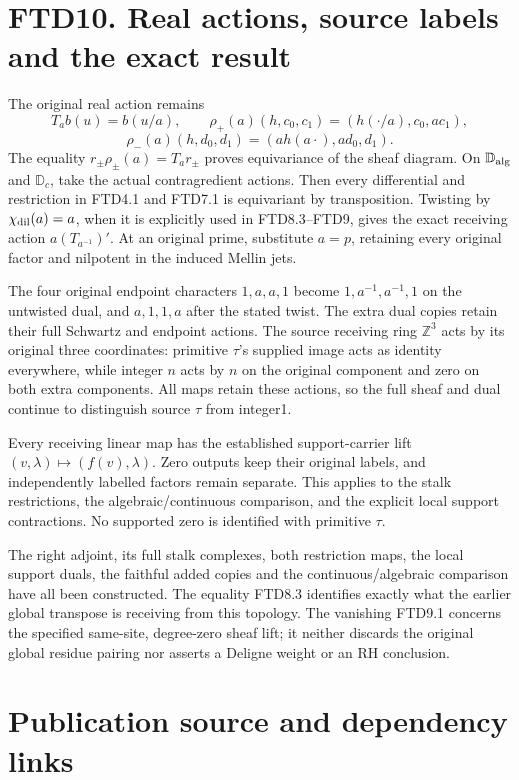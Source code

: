 \section{FTD10. Real actions, source labels and the exact
result}\label{ftd10.-real-actions-source-labels-and-the-exact-result}

The original real action remains \[
T_ab(u)=b(u/a),\qquad
\rho_+(a)(h,c_0,c_1)=(h(\cdot/a),c_0,ac_1),
\] \[
\rho_-(a)(h,d_0,d_1)=(a h(a\cdot),ad_0,d_1).
\] The equality \(r_\pm\rho_\pm(a)=T_ar_\pm\) proves equivariance of the
sheaf diagram. On \(\mathbb D_{\rm alg}\) and \(\mathbb D_c\), take the
actual contragredient actions. Then every differential and restriction
in FTD4.1 and FTD7.1 is equivariant by transposition. Twisting by
\(\chi_{\rm dil}(a)=a\), when it is explicitly used in FTD8.3--FTD9,
gives the exact receiving action \(a(T_{a^{-1}})'\). At an original
prime, substitute \(a=p\), retaining every original factor and nilpotent
in the induced Mellin jets.

The four original endpoint characters \(1,a,a,1\) become
\(1,a^{-1},a^{-1},1\) on the untwisted dual, and \(a,1,1,a\) after the
stated twist. The extra dual copies retain their full Schwartz and
endpoint actions. The source receiving ring \(\mathbb Z^3\) acts by its
original three coordinates: primitive \(\tau\)'s supplied image acts as
identity everywhere, while integer \(n\) acts by \(n\) on the original
component and zero on both extra components. All maps retain these
actions, so the full sheaf and dual continue to distinguish source
\(\tau\) from integer1.

Every receiving linear map has the established support-carrier lift
\((v,\lambda)\mapsto(f(v),\lambda)\). Zero outputs keep their original
labels, and independently labelled factors remain separate. This applies
to the stalk restrictions, the algebraic/continuous comparison, and the
explicit local support contractions. No supported zero is identified
with primitive \(\tau\).

The right adjoint, its full stalk complexes, both restriction maps, the
local support duals, the faithful added copies and the
continuous/algebraic comparison have all been constructed. The equality
FTD8.3 identifies exactly what the earlier global transpose is receiving
from this topology. The vanishing FTD9.1 concerns the specified
same-site, degree-zero sheaf lift; it neither discards the original
global residue pairing nor asserts a Deligne weight or an RH conclusion.

\section{Publication source and dependency
links}\label{publication-source-and-dependency-links}

